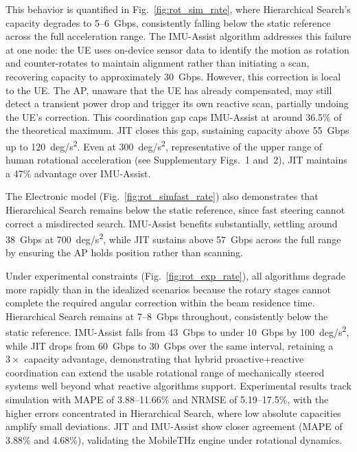 \documentclass[fleqn,10pt]{wlscirep}
\begin{document}
This behavior is quantified in Fig.~\ref{fig:rot_sim_rate}, where Hierarchical Search's capacity degrades to \SI{5}{}--\SI{6}{Gbps}, consistently falling below the static reference across the full acceleration range. The IMU-Assist algorithm addresses this failure at one node: the UE uses on-device sensor data to identify the motion as rotation and counter-rotates to maintain alignment rather than initiating a scan, recovering capacity to approximately \SI{30}{Gbps}. However, this correction is local to the UE. The AP, unaware that the UE has already compensated, may still detect a transient power drop and trigger its own reactive scan, partially undoing the UE's correction. This coordination gap caps IMU-Assist at around 36.5\% of the theoretical maximum. JIT closes this gap, sustaining capacity above \SI{55}{Gbps} up to \SI{120}{deg/s^2}. Even at \SI{300}{deg/s^2}, representative of the upper range of human rotational acceleration (see Supplementary Figs.~1 and~2), JIT maintains a 47\% advantage over IMU-Assist.

The Electronic model (Fig.~\ref{fig:rot_simfast_rate}) also demonstrates that Hierarchical Search remains below the static reference, since fast steering cannot correct a misdirected search. IMU-Assist benefits substantially, settling around \SI{38}{Gbps} at \SI{700}{deg/s^2}, while JIT sustains above \SI{57}{Gbps} across the full range by ensuring the AP holds position rather than scanning.

Under experimental constraints (Fig.~\ref{fig:rot_exp_rate}), all algorithms degrade more rapidly than in the idealized scenarios because the rotary stages cannot complete the required angular correction within the beam residence time. Hierarchical Search remains at \SI{7}{}--\SI{8}{Gbps} throughout, consistently below the static reference. IMU-Assist falls from \SI{43}{Gbps} to under \SI{10}{Gbps} by \SI{100}{deg/s^2}, while JIT drops from \SI{60}{Gbps} to \SI{30}{Gbps} over the same interval, retaining a $3\times$ capacity advantage, demonstrating that hybrid proactive+reactive coordination can extend the usable rotational range of mechanically steered systems well beyond what reactive algorithms support. Experimental results track simulation with MAPE of 3.88--11.66\% and NRMSE of 5.19--17.5\%, with the higher errors concentrated in Hierarchical Search, where low absolute capacities amplify small deviations. JIT and IMU-Assist show closer agreement (MAPE of 3.88\% and 4.68\%), validating the MobileTHz engine under rotational dynamics.
\end{document}
